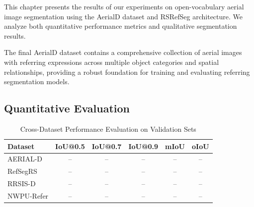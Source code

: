 \cleardoublepage
\label{chap:conclusion}

This chapter presents the results of our experiments on open-vocabulary aerial image segmentation using the AerialD dataset and RSRefSeg architecture. We analyze both quantitative performance metrics and qualitative segmentation results.

The final AerialD dataset contains a comprehensive collection of aerial images with referring expressions across multiple object categories and spatial relationships, providing a robust foundation for training and evaluating referring segmentation models.

\subsection{Quantitative Evaluation}

\begin{table}[H]
\centering
\caption{Cross-Dataset Performance Evaluation on Validation Sets}
\label{tab:cross_dataset_results}
\begin{tabular}{@{}lccccc@{}}
\toprule
\textbf{Dataset} & \textbf{IoU@0.5} & \textbf{IoU@0.7} & \textbf{IoU@0.9} & \textbf{mIoU} & \textbf{oIoU} \\
\midrule
AERIAL-D & -- & -- & -- & -- & -- \\
RefSegRS & -- & -- & -- & -- & -- \\
RRSIS-D & -- & -- & -- & -- & -- \\
NWPU-Refer & -- & -- & -- & -- & -- \\
\bottomrule
\end{tabular}
\end{table}

